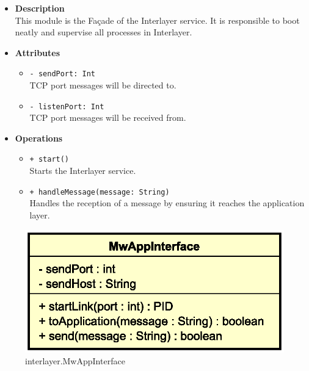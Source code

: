 \FloatBarrier
\begin{itemize}
  \item \textbf{Description} \\
    This module is the Fa\c cade of the Interlayer service. It is responsible
    to boot neatly and supervise all processes in Interlayer.
  \item \textbf{Attributes}
    \begin{itemize}
      \item \texttt{- sendPort: Int} \\
    TCP port messages will be directed to.
      \item \texttt{- listenPort: Int} \\
    TCP port messages will be received from.
    \end{itemize}
  \item \textbf{Operations}
  \begin{itemize}
    \item \texttt{+ start()} \\
    Starts the Interlayer service.
    \item \texttt{+ handleMessage(message: String)} \\
    Handles the reception of a message by ensuring it reaches the application
    layer.
  \end{itemize}
\end{itemize}


\begin{figure}[H]
  \centering
  \includegraphics[width=.5\columnwidth]{images/solution/mw/int/mwapp.eps}
  \caption{interlayer.MwAppInterface}
  \label{fig:mw-interlayer-mwappinterface}
\end{figure}

